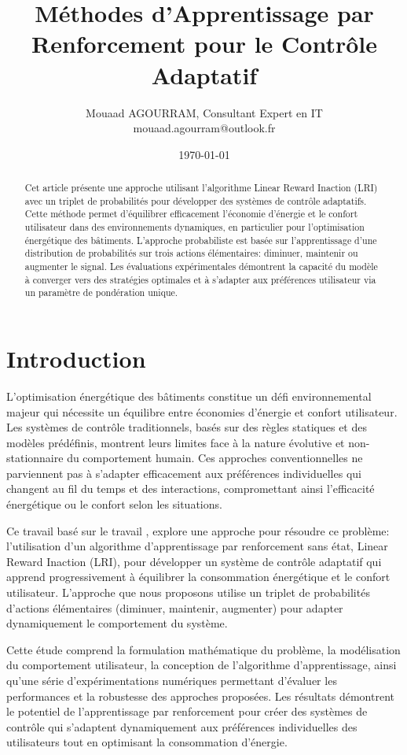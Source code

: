 \documentclass[a4paper,11pt]{article}
\title{Méthodes d'Apprentissage par Renforcement pour le Contrôle Adaptatif}
\author{Mouaad AGOURRAM, Consultant Expert en IT \\ 
        mouaad.agourram@outlook.fr}
\date{\today}
\begin{document}
\maketitle
\vspace{3cm}
\begin{abstract}
Cet article présente une approche utilisant l'algorithme Linear Reward Inaction (LRI) avec un triplet de probabilités pour développer des systèmes de contrôle adaptatifs. Cette méthode permet d'équilibrer efficacement l'économie d'énergie et le confort utilisateur dans des environnements dynamiques, en particulier pour l'optimisation énergétique des bâtiments.
 L'approche probabiliste est basée sur l'apprentissage d'une distribution de probabilités sur trois actions élémentaires: diminuer, maintenir ou augmenter le signal. Les évaluations expérimentales démontrent la capacité du modèle à converger vers des stratégies optimales et à s'adapter aux préférences utilisateur via un paramètre de pondération unique.
\end{abstract}

\clearpage
\section{Introduction}
L'optimisation énergétique des bâtiments constitue un défi environnemental majeur qui nécessite un équilibre entre économies d'énergie et confort utilisateur. Les systèmes de contrôle traditionnels, basés sur des règles statiques et des modèles prédéfinis, montrent leurs limites face à la nature évolutive et non-stationnaire du comportement humain. Ces approches conventionnelles ne parviennent pas à s'adapter efficacement aux préférences individuelles qui changent au fil du temps et des interactions, compromettant ainsi l'efficacité énergétique ou le confort selon les situations.

Ce travail basé sur le travail \cite{haddam2022}, explore une approche  pour résoudre ce problème: l'utilisation d'un algorithme d'apprentissage par renforcement sans état, Linear Reward Inaction (LRI), pour développer un système de contrôle adaptatif qui apprend progressivement à équilibrer la consommation énergétique et le confort utilisateur. L'approche que nous proposons utilise un triplet de probabilités d'actions élémentaires (diminuer, maintenir, augmenter) pour adapter dynamiquement le comportement du système.

Cette étude comprend la formulation mathématique du problème, la modélisation du comportement utilisateur, la conception de l'algorithme d'apprentissage, ainsi qu'une série d'expérimentations numériques permettant d'évaluer les performances et la robustesse des approches proposées. Les résultats démontrent le potentiel de l'apprentissage par renforcement pour créer des systèmes de contrôle qui s'adaptent dynamiquement aux préférences individuelles des utilisateurs tout en optimisant la consommation d'énergie.
\end{document}
